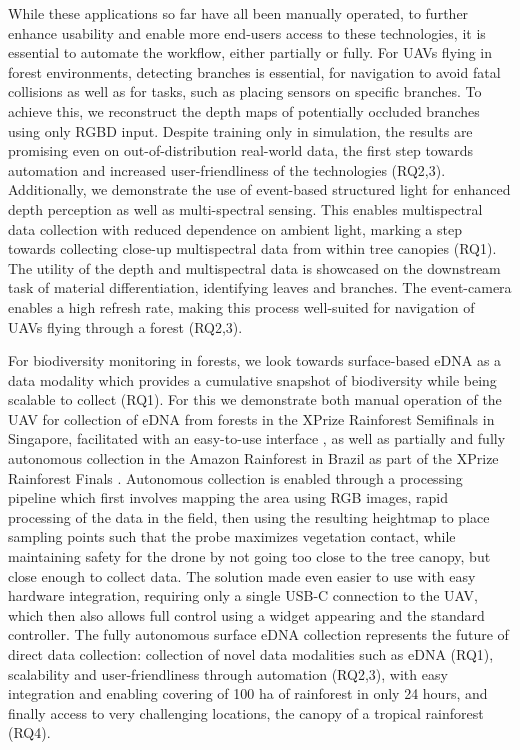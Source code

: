 While these applications so far have all been manually operated, to further enhance usability and enable more end-users access to these technologies, it is essential to automate the workflow, either partially or fully. For UAVs flying in forest environments, detecting branches is essential, for navigation to avoid fatal collisions as well as for tasks, such as placing sensors on specific branches. To achieve this, we reconstruct the depth maps of potentially occluded branches using only RGBD input. Despite training only in simulation, the results are promising even on out-of-distribution real-world data, the first step towards automation and increased user-friendliness of the technologies (RQ2,3). Additionally, we demonstrate the use of event-based structured light for enhanced depth perception as well as multi-spectral sensing. This enables multispectral data collection with reduced dependence on ambient light, marking a step towards collecting close-up multispectral data from within tree canopies (RQ1). The utility of the depth and multispectral data is showcased on the downstream task of material differentiation, identifying leaves and branches. The event-camera enables a high refresh rate, making this process well-suited for navigation of UAVs flying through a forest (RQ2,3).

For biodiversity monitoring in forests, we look towards surface-based eDNA as a data modality which provides a cumulative snapshot of biodiversity while being scalable to collect (RQ1). For this we demonstrate both manual operation of the UAV for collection of eDNA from forests in the XPrize Rainforest Semifinals in Singapore, facilitated with an easy-to-use interface \cite{eprobe},  as well as partially and fully autonomous collection in the Amazon Rainforest in Brazil as part of the XPrize Rainforest Finals \cite{}. Autonomous collection is enabled through a processing pipeline which first involves mapping the area using RGB images, rapid processing of the data in the field, then using the resulting heightmap to place sampling points such that the probe maximizes vegetation contact, while maintaining safety for the drone by not going too close to the tree canopy, but close enough to collect data. The solution made even easier to use with easy hardware integration, requiring only a single USB-C connection to the UAV, which then also allows full control using a widget appearing and the standard controller. The fully autonomous surface eDNA collection represents the future of direct data collection: collection of novel data modalities such as eDNA (RQ1), scalability and user-friendliness through automation (RQ2,3), with easy integration and enabling covering of 100 ha of rainforest in only 24 hours, and finally access to very challenging locations, the canopy of a tropical rainforest (RQ4).


